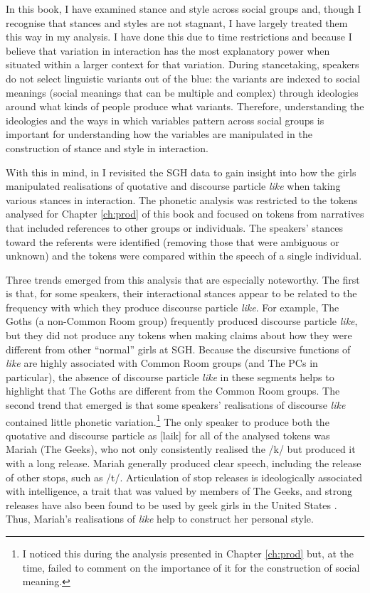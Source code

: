 In this book, I have examined stance and style across social groups and, though I recognise that stances and styles are not stagnant, I have largely treated them this way in my analysis.  I have done this due to time restrictions and because I believe that variation in interaction has the most explanatory power when situated within a larger context for that variation.  During stancetaking, speakers do not select linguistic variants out of the blue: the variants are indexed to social meanings (social meanings that can be multiple and complex) through ideologies around what kinds of people produce what variants.  Therefore, understanding the ideologies and the ways in which variables pattern across social groups is important for understanding how the variables are manipulated in the construction of stance and style in interaction.

With this in mind, in \citet{dragerinpress-DPVC} I revisited the SGH data to gain insight into how the girls manipulated realisations of quotative and discourse particle \textit{like} when taking various stances in interaction.  The phonetic analysis was restricted to the tokens analysed for Chapter \ref{ch:prod} of this book and focused on tokens from narratives that included references to other groups or individuals.  The speakers' stances toward the referents were identified (removing those that were ambiguous or unknown) and the tokens were compared within the speech of a single individual.  
 

Three trends emerged from this analysis that are especially noteworthy.  The first is that, for some speakers, their interactional stances appear to be related to the frequency with which they produce discourse particle \textit{like}.  For example, The Goths (a non-Common Room group) frequently produced discourse particle \textit{like}, but they did not produce any tokens when making claims about how they were different from other ``normal'' girls at SGH.  Because the discursive functions of \textit{like} are highly associated with Common Room groups (and The PCs in particular), the absence of discourse particle \textit{like} in these segments helps to highlight that The Goths are different from the Common Room groups.  The second trend that emerged is that some speakers' realisations of discourse \textit{like} contained little phonetic variation.\footnote{I noticed this during the analysis presented in Chapter \ref{ch:prod} but, at the time, failed to comment on the importance of it for the construction of social meaning.}  The only speaker to produce both the quotative and discourse particle as [laik] for all of the analysed tokens was Mariah (The Geeks), who not only consistently realised the /k/ but produced it with a long release.  Mariah generally produced clear speech, including the release of other stops, such as /t/.  Articulation of stop releases is ideologically associated with intelligence, a trait that was valued by members of The Geeks, and strong releases have also been found to be used by geek girls in the United States \citep[125]{bucholtz1998}. Thus, Mariah's realisations of \textit{like} help to construct her personal style. 
\largerpage[-1]

